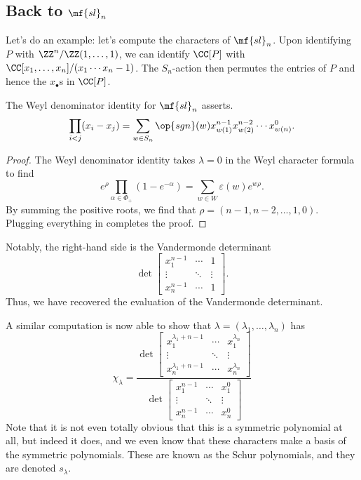 \documentclass[../notes.tex]{subfiles}
\begin{document}
\subsection{Back to \texorpdfstring{$\mf{sl}_n$}{sl n}}
Let's do an example: let's compute the characters of $\mf{sl}_n$. Upon identifying $P$ with $\ZZ^n/\ZZ(1,\ldots,1)$, we can identify $\CC[P]$ with $\CC[x_1,\ldots,x_n]/(x_1\cdots x_n-1)$. The $S_n$-action then permutes the entries of $P$ and hence the $x_\bullet$s in $\CC[P]$.
\begin{proposition}
	The Weyl denominator identity for $\mf{sl}_n$ asserts.
	\[\prod_{i<j}(x_i-x_j)=\sum_{w\in S_n}\op{sgn}(w)x_{w(1)}^{n-1}x_{w(2)}^{n-2}\cdots x_{w(n)}^0.\]
\end{proposition}
\begin{proof}
	The Weyl denominator identity takes $\lambda=0$ in the Weyl character formula to find
	\[e^\rho\prod_{\alpha\in\Phi_+}\left(1-e^{-\alpha}\right)=\sum_{w\in W}\varepsilon(w)e^{w\rho}.\]
	By summing the positive roots, we find that $\rho=(n-1,n-2,\ldots,1,0)$. Plugging everything in completes the proof.
\end{proof}
\begin{remark}
	Notably, the right-hand side is the Vandermonde determinant
	\[\det\begin{bmatrix}
		x_1^{n-1} & \cdots & 1 \\
		\vdots & \ddots & \vdots \\
		x_n^{n-1} & \cdots & 1
	\end{bmatrix}.\]
	Thus, we have recovered the evaluation of the Vandermonde determinant.
\end{remark}
A similar computation is now able to show that $\lambda=(\lambda_1,\ldots,\lambda_n)$ has
\[\chi_\lambda=\frac{\det\begin{bmatrix}
	x_1^{\lambda_1+n-1} & \cdots & x_1^{\lambda_n} \\
	\vdots & \ddots & \vdots \\
	x_n^{\lambda_1+n-1} & \cdots & x_n^{\lambda_n}
\end{bmatrix}}{\det\begin{bmatrix}
	x_1^{n-1} & \cdots & x_1^{0} \\
	\vdots & \ddots & \vdots \\
	x_n^{n-1} & \cdots & x_n^{0}
\end{bmatrix}}\]
Note that it is not even totally obvious that this is a symmetric polynomial at all, but indeed it does, and we even know that these characters make a basis of the symmetric polynomials. These are known as the Schur polynomials, and they are denoted $s_\lambda$.
\end{document}
